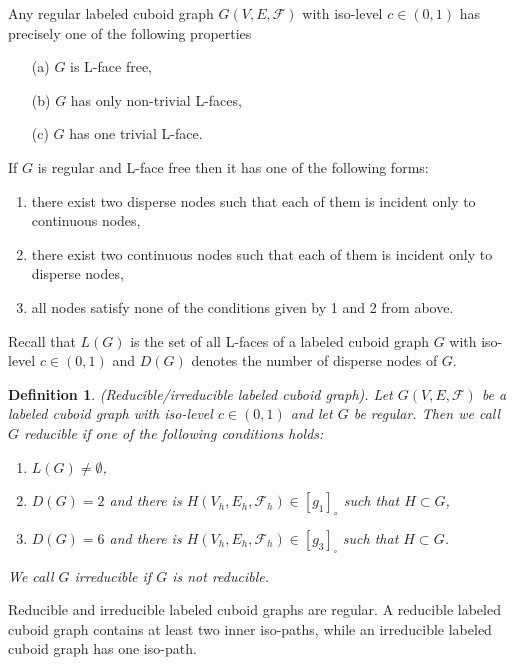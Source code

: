\documentclass[a4paper,11pt]{article}
\newtheorem{definition}[theorem]{Definition}
\begin{document}
Any regular labeled cuboid graph $G(V,E,\mathcal{F})$ with iso-level $c\in (0,1)$ has precisely
one of the following properties
\begin{enumerate}
\item[(a)] $G$ is L-face free,
\item[(b)] $G$ has only non-trivial L-faces,
\item[(c)] $G$ has one trivial L-face.
\end{enumerate}
If $G$ is regular and L-face free then it has one of the following forms:
\begin{enumerate}
\item there exist two disperse nodes such that each of them is incident only to continuous nodes,
\item there exist two continuous nodes such that each of them is incident only to disperse nodes,
\item all nodes satisfy none of the conditions given by 1 and 2 from above.
\end{enumerate}

\noindent Recall that $L(G)$ is the set of all L-faces of a labeled cuboid graph $G$ with iso-level
$c\in (0,1)$ and $D(G)$ denotes the number of disperse nodes of $G$.
\begin{definition}(Reducible/irreducible labeled cuboid graph). Let $G(V,E,\mathcal{F})$ be a labeled
cuboid graph with iso-level $c\in (0,1)$ and let $G$ be regular. Then we call $G$ reducible if one of
the following conditions holds:
\begin{enumerate}
\item $L(G)\neq\emptyset$,
\item $D(G)=2$ and there is $H(V_h,E_h,\mathcal{F}_h)\in [g_1]_{\circ}$ such that $H\subset G$,
\item $D(G)=6$ and there is $H(V_h,E_h,\mathcal{F}_h)\in [g_3]_{\square}$ such that $H\subset G$.
\end{enumerate}
We call $G$ irreducible if $G$ is not reducible.
\label{def:class-1}
\end{definition}
Reducible and irreducible labeled cuboid graphs are regular. A reducible
labeled cuboid graph contains at least two inner iso-paths, while an irreducible labeled cuboid graph
has one iso-path.\\
\end{document}
